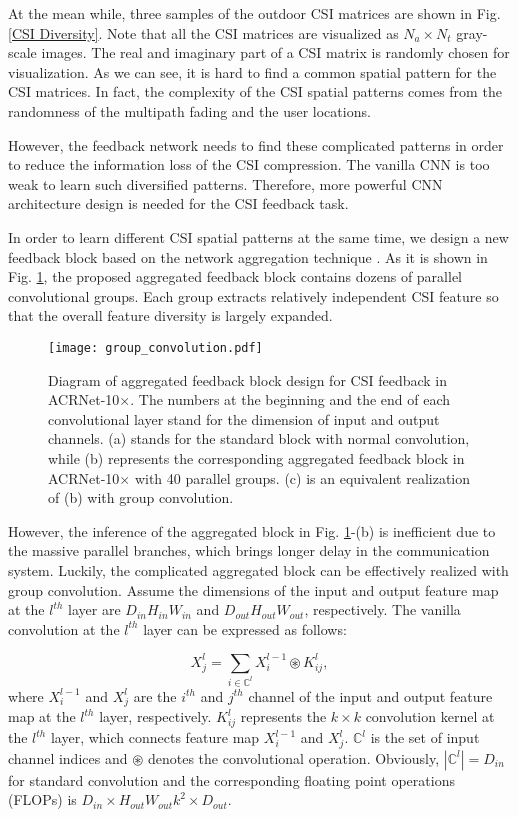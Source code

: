 \documentclass[12pt, draftclsnofoot, onecolumn]{IEEEtran}
\begin{document}
At the mean while, three samples of the outdoor CSI matrices are shown in Fig. \ref{CSI Diversity}. Note that all the CSI matrices are visualized as $N_a\times N_t$ gray-scale images. The real and imaginary part of a CSI matrix is randomly chosen for visualization. As we can see, it is hard to find a common spatial pattern for the CSI matrices. In fact, the complexity of the CSI spatial patterns comes from the randomness of the multipath fading and the user locations.

However, the feedback network needs to find these complicated patterns in order to reduce the information loss of the CSI compression. The vanilla CNN is too weak to learn such diversified patterns. Therefore, more powerful CNN architecture design is needed for the CSI feedback task.

In order to learn different CSI spatial patterns at the same time, we design a new feedback block based on the network aggregation technique \cite{xie2017aggregated}. As it is shown in Fig. \ref{Group Convolution}, the proposed aggregated feedback block contains dozens of parallel convolutional groups. Each group extracts relatively independent CSI feature so that the overall feature diversity is largely expanded.

\begin{figure}[!t]
\centering
\texttt{[image: group\_convolution.pdf]}
\caption{Diagram of aggregated feedback block design for CSI feedback in ACRNet-10$\times$. The numbers at the beginning and the end of each convolutional layer stand for the dimension of input and output channels. (a) stands for the standard block with normal convolution, while (b) represents the corresponding aggregated feedback block in ACRNet-10$\times$ with 40 parallel groups. (c) is an equivalent realization of (b) with group convolution.}
\label{Group Convolution}
\end{figure}

However, the inference of the aggregated block in Fig. \ref{Group Convolution}-(b) is inefficient due to the massive parallel branches, which brings longer delay in the communication system. Luckily, the complicated aggregated block can be effectively realized with group convolution. Assume the dimensions of the input and output feature map at the $l^{th}$ layer are $D_{in}H_{in}W_{in}$ and $D_{out}H_{out}W_{out}$, respectively. The vanilla convolution at the $l^{th}$ layer can be expressed as follows:

\begin{equation} \label{eq-vanilla-conv}
  X_j^l = \sum_{i \in \mathbb{C}^l} X_i^{l-1} \circledast K_{ij}^l,
\end{equation}
where $X_i^{l-1}$ and $X_j^l$ are the $i^{th}$ and $j^{th}$ channel of the input and output feature map at the $l^{th}$ layer, respectively. $K_{ij}^l$ represents the $k\times k$ convolution kernel at the $l^{th}$ layer, which connects feature map $X_i^{l-1}$ and $X_j^l$. $\mathbb{C}^l$ is the set of input channel indices and $\circledast$ denotes the convolutional operation. Obviously, $|\mathbb{C}^l| = D_{in}$ for standard convolution and the corresponding floating point operations (FLOPs) is $D_{in}\times H_{out}W_{out}k^2 \times D_{out}$.
\end{document}
